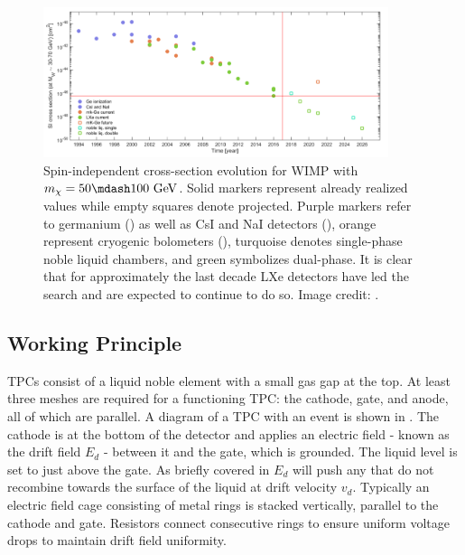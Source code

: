 \begin{figure}
\centering
\includegraphics[width=0.9\textwidth]{SensitivityEvolutionBetter}
\caption{Spin-independent cross-section evolution for WIMP with $m_{\chi} = 50 \mdash 100\ \mathrm{GeV}$.  Solid markers represent
already realized
values while empty squares denote projected.  Purple markers refer to germanium () as well as CsI and NaI
detectors (), orange represent cryogenic bolometers (), turquoise denotes single-phase
noble liquid chambers, and green symbolizes dual-phase.  It is
clear that for approximately the last decade LXe detectors have led the search and are
expected to continue to do so.  Image credit: .}
\label{fig:sensitivity_evo}
\end{figure}

\subsection{Working Principle}
\label{subsec:tpcs_working_principle}
TPCs consist of a liquid noble element with a small gas gap at the top.  At least three meshes are required for a functioning TPC: the
cathode, gate, and anode, all of which are parallel.  A diagram of a TPC with an event is shown in .  The cathode is
at the bottom of the detector and applies an electric field - known as the drift field $E_{d}$ - between
it and the gate, which is grounded.  The liquid level is set to just above the gate.  As briefly covered in 
$E_{d}$ will push any \electron that do not recombine towards the surface of the liquid at drift velocity $v_{d}$.  Typically an electric
field cage consisting
of metal rings is stacked vertically, parallel to the cathode and gate.  Resistors connect consecutive rings to ensure uniform voltage
drops to maintain drift field uniformity.

